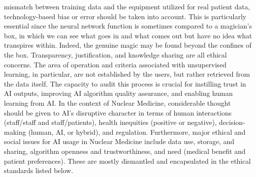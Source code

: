 \documentclass[12pt]{article}
\begin{document}
mismatch between training data and the equipment utilized for real patient data, technology-based bias or
error should be taken into account. This is particularly essential since the neural network function is sometimes
compared to a magician's box, in which we can see what goes in and what comes out but have no idea what
transpires within. Indeed, the genuine magic may be found beyond the confines of the box. Transparency,
justification, and knowledge sharing are all ethical concerns. The area of operation and criteria associated with
unsupervised learning, in particular, are not established by the users, but rather retrieved from the data itself. The capacity to audit this process is crucial for instilling trust in AI outputs, improving AI algorithm quality
assurance, and enabling human learning from AI.
In the context of Nuclear Medicine, considerable thought should be given to AI's disruptive character in terms of
human interactions (staff/staff and staff/patients), health inequities (positive or negative), decision-making
(human, AI, or hybrid), and regulation. Furthermore, major ethical and social issues for AI usage in Nuclear
Medicine include data use, storage, and sharing, algorithm openness and trustworthiness, and need (medical
benefit and patient preferences). These are mostly dismantled and encapsulated in the ethical standards listed
below.
\\ 




\end{document}
